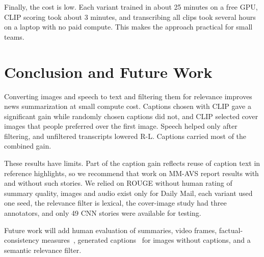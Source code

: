 \documentclass[conference]{IEEEtran}
\begin{document}
Finally, the cost is low. Each variant trained in about 25 minutes on a free GPU, CLIP scoring took about 3 minutes, and transcribing all clips took several hours on a laptop with no paid compute. This makes the approach practical for small teams.

\section{Conclusion and Future Work}
Converting images and speech to text and filtering them for relevance improves news summarization at small compute cost. Captions chosen with CLIP gave a significant gain while randomly chosen captions did not, and CLIP selected cover images that people preferred over the first image. Speech helped only after filtering, and unfiltered transcripts lowered R-L. Captions carried most of the combined gain.

These results have limits. Part of the caption gain reflects reuse of caption text in reference highlights, so we recommend that work on MM-AVS report results with and without such stories. We relied on ROUGE without human rating of summary quality, images and audio exist only for Daily Mail, each variant used one seed, the relevance filter is lexical, the cover-image study had three annotators, and only 49 CNN stories were available for testing.

Future work will add human evaluation of summaries, video frames, factual-consistency measures~\cite{kryscinski2020factcc}, generated captions~\cite{li2022blip} for images without captions, and a semantic relevance filter.



\end{document}
